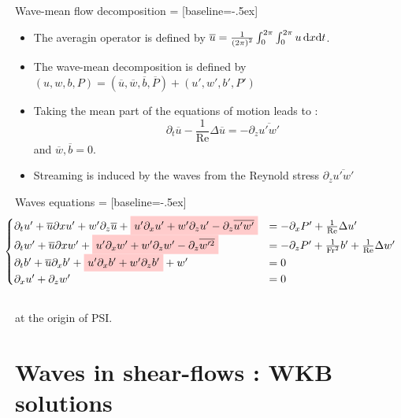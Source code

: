 \documentclass[10pt]{beamer}
\newcommand{\NodeFill}[3]{\tikz[baseline]{\node[fill=#1!20,anchor=base](#2){#3};}}
\begin{document}
\begin{frame}[fragile]{Wave\--mean flow decomposition}
   = [baseline=-.5ex]
  \begin{itemize}
    \item The averagin operator is defined by $\overline{u}=\frac{1}{\left(2\pi\right)^{2}}\intop_{0}^{2\pi}\intop_{0}^{2\pi}u\,\mathrm{d}x\mathrm{d}t$.
    \item The wave\--mean decomposition is defined by $\left(u,w,b,P\right)=\left(\overline{u},\overline{w},\overline{b},\overline{P}\right)+\left(u',w',b',P'\right)$
    \item Taking the mean part of the equations of motion leads to :\begin{equation*}\partial_{t}\overline{u}-\frac{1}{\mathrm{Re}}\Delta\overline{u} =- \partial_{z}\overline{u'w'}\end{equation*} and $\overline{w},\overline{b}=0$.
    \item Streaming is induced by the waves from the Reynold stress $\partial_{z}\overline{u'w'}$
  \end{itemize}
\end{frame}

\begin{frame}[fragile]{Waves equations}
   = [baseline=-.5ex]
  \begin{equation*}
    \!\!\!\!\!\!\!\!\!\!\!\!\!\!
    \begin{cases}
      \partial_{t}u'+\overline{u}\partial{x}u'+w'\partial_{z}\overline{u}+\NodeFill{red}{}{$u'\partial_{x}u'+w'\partial_{z}u'-\partial_{z}\overline{u'w'} $}& = -\partial_{x}P'+\frac{1}{\mathrm{Re}}\Delta u'\\
      \partial_{t}w'+\overline{u}\partial{x}w'+\NodeFill{red}{}{$u'\partial_{x}w'+w'\partial_{z}w'-\partial_{z}\overline{w'^{2}}$}&=-\partial_{z}P'+\frac{1}{\mathrm{Fr}^{2}}b'+\frac{1}{\mathrm{Re}}\Delta w'\\
      \partial_{t}b'+\overline{u}\partial_{x}b'+\NodeFill{red}{}{$u'\partial_{x}b'+w'\partial_{z}b'$}+w'&=0\\
      \partial_{x}u'+\partial_{z}w'&=0
    \end{cases}
  \end{equation*}\\
  \NodeFill{red}{}{Non\--linear terms} at the origin of PSI.
\end{frame}


\section{Waves in shear\--flows : WKB solutions}
\end{document}
